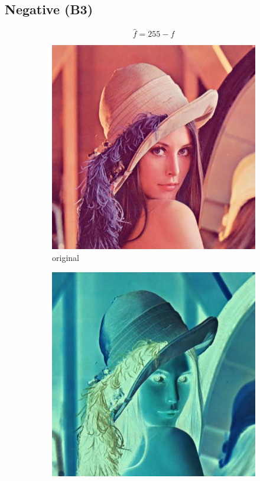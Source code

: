 \documentclass[12pt]{article}
\newcommand{\subfiguresize}{.3\textwidth}
\begin{document}
\subsection*{Negative (B3)}

\begin{equation}
    \hat{f} = 255 - f
\end{equation}

\begin{figure}[H]\centering
    \begin{subfigure}[t]{\subfiguresize}\centering
        \includegraphics[width=\textwidth]{lenac.png}
        \caption{original}
    \end{subfigure}
    \hspace{.05\textwidth}
    \begin{subfigure}[t]{\subfiguresize}\centering
        \includegraphics[width=\textwidth]{lenac_negative.png}

\end{subfigure}
\end{figure}
\end{document}
